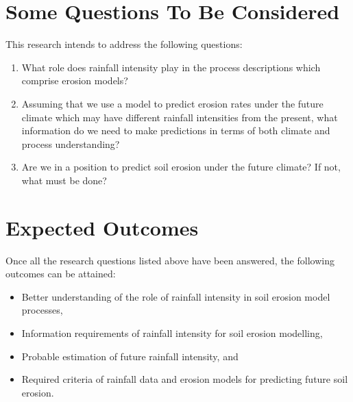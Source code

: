\section{Some Questions To Be Considered}
\label{sec:ResearchQuestions}
This research intends to address the following questions:
\begin{enumerate}[{Question} 1.]
  \item What role does rainfall intensity play in the process descriptions which
comprise erosion models?\label{researchquestion1}
  \item Assuming that we use a model to predict erosion rates under the future
climate which may have different rainfall intensities from the present, what
information do we need to make predictions in terms of both climate and process
understanding?\label{researchquestion2}
  \item Are we in a position to predict soil erosion under the future climate?
If not, what must be done?\label{researchquestion3}
\end{enumerate}

\section{Expected Outcomes}
\label{sec:ExpectedOutcomes}
Once all the research questions listed above have been answered, the following
outcomes can be attained:
\begin{itemize}
  \item Better understanding of the role of rainfall intensity in soil erosion
model processes,
  \item Information requirements of rainfall intensity for soil erosion
modelling,
  \item Probable estimation of future rainfall intensity, and
  \item Required criteria of rainfall data and erosion models for predicting
future soil erosion.
\end{itemize}

